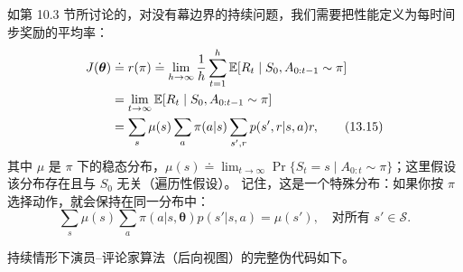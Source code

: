 \documentclass[UTF8, 12pt, fontset=fandol, oneside]{ctexart}
\begin{document}
如第 10.3 节所讨论的，对没有幕边界的持续问题，我们需要把性能定义为每时间步奖励的平均率：
\begin{align}
J(\boldsymbol{\theta})
&\doteq r(\pi)\doteq \lim_{h\to\infty}\frac{1}{h}\sum_{t=1}^{h}\mathbb{E}[R_t\mid S_0,A_{0:t-1}\sim\pi]\notag\\
&=\lim_{t\to\infty}\mathbb{E}[R_t\mid S_0,A_{0:t-1}\sim\pi]\notag\\
&=\sum_s\mu(s)\sum_a\pi(a|s)\sum_{s',r}p(s',r|s,a)r,
\tag{13.15}
\end{align}
其中 $\mu$ 是 $\pi$ 下的稳态分布，$\mu(s)\doteq \lim_{t\to\infty}\Pr\{S_t=s\mid A_{0:t}\sim\pi\}$；这里假设该分布存在且与 $S_0$ 无关（遍历性假设）。
记住，这是一个特殊分布：如果你按 $\pi$ 选择动作，就会保持在同一分布中：
\begin{equation}
\sum_s\mu(s)\sum_a\pi(a|s,\boldsymbol{\theta})p(s'|s,a)=\mu(s'),\quad \text{对所有 }s'\in\mathcal{S}.
\tag{13.16}
\end{equation}

持续情形下演员--评论家算法（后向视图）的完整伪代码如下。
\end{document}
